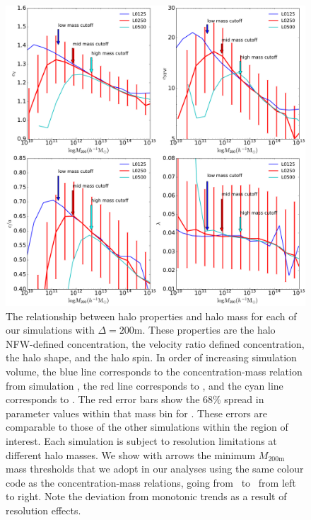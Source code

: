 \documentclass[usenatbib,fleqn]{mnras}
\begin{document}
\begin{figure}
\centering
\includegraphics[width=\textwidth]{masscuts_d200.pdf}
\caption{
The relationship between halo properties and halo mass for each of our simulations with $\Delta =200$m. These properties are the halo NFW-defined concentration, the velocity ratio defined concentration, the halo shape, and the halo spin. In order of increasing simulation volume, the blue line corresponds to the concentration-mass relation from simulation \simA, the red line corresponds to \simB, and the cyan line corresponds to \simC. The red error bars show the 68\% spread in parameter values within that mass bin for \simB. These errors are comparable to those of the other simulations within the region of interest. Each simulation is subject to resolution limitations at different halo masses. We show with arrows the minimum $M_{200\text{m}}$ mass thresholds that we adopt in our analyses using the same colour code as the concentration-mass relations, going from \simA \ to \simC \ from left to right. Note the deviation from monotonic trends as a result of resolution effects.  
}
\label{fig:massrelation}
\end{figure}
\end{document}
